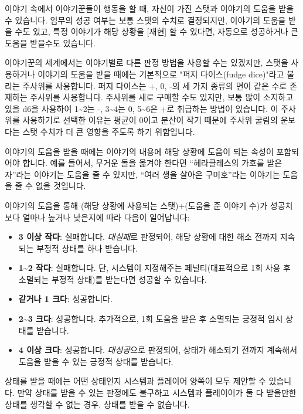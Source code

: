 \documentclass[12pt]{report}
\begin{document}
	이야기 속에서 이야기꾼들이 행동을 할 때, 자신이 가진 스탯과 이야기의 도움을 받을 수 있습니다. 임무의 성공 여부는 보통 스탯의 수치로 결정되지만, 이야기의 도움을 받을 수도 있고, 특정 이야기가 해당 상황을 [재현] 할 수 있다면, 자동으로 성공하거나 큰 도움을 받을수도 있습니다.
	
	\bigskip
	
	이야기꾼의 세계에서는 이야기별로 다른 판정 방법을 사용할 수는 있겠지만, 스탯을 사용하거나 이야기의 도움을 받을 때에는 기본적으로 "퍼지 다이스(fudge dice)"라고 불리는 주사위를 사용합니다. 퍼지 다이스는 +, 0, -의 세 가지 종류의 면이 같은 수로 존재하는 주사위를 사용합니다. 주사위를 새로 구매할 수도 있지만, 보통 많이 소지하고 있을 d6을 사용하여 1\textasciitilde2는 -, 3\textasciitilde4는 0, 5\textasciitilde6은 +로 취급하는 방법이 있습니다. 이 주사위를 사용하기로 선택한 이유는 평균이 0이고 분산이 작기 때문에 주사위 굴림의 운보다는 스탯 수치가 더 큰 영향을 주도록 하기 위함입니다.
	
	\bigskip
	
	이야기의 도움을 받을 때에는 이야기의 내용에 해당 상황에 도움이 되는 속성이 포함되어야 합니다. 예를 들어서, 무거운 돌을 옮겨야 한다면 “헤라클레스의 가호를 받은 자”라는 이야기는 도움을 줄 수 있지만, “여러 생을 살아온 구미호”라는 이야기는 도움을 줄 수 없을 것입니다.
	
	이야기의 도움을 통해 (해당 상황에 사용되는 스탯)+(도움을 준 이야기 수)가 성공치보다 얼마나 높거나 낮은지에 따라 다음이 일어납니다:
	\begin{itemize}
		\item \textbf{3 이상 작다}: 실패합니다. \emph{대실패}로 판정되어, 해당 상황에 대한 해소 전까지 지속되는 부정적 상태를 하나 받습니다.
		\item \textbf{1\textasciitilde2 작다}: 실패합니다. 단, 시스템이 지정해주는 페널티(대표적으로 1회 사용 후 소멸되는 부정적 상태)를 받는다면 성공할 수 있습니다.
		\item \textbf{같거나 1 크다}: 성공합니다.
		\item \textbf{2\textasciitilde3 크다}: 성공합니다. 추가적으로, 1회 도움을 받은 후 소멸되는 긍정적 임시 상태를 받습니다.
		\item \textbf{4 이상 크다}: 성공합니다. \emph{대성공}으로 판정되어, 상태가 해소되기 전까지 계속해서 도움을 받을 수 있는 긍정적 상태를 받습니다.
	\end{itemize}
	상태를 받을 때에는 어떤 상태인지 시스템과 플레이어 양쪽이 모두 제안할 수 있습니다. 만약 상태를 받을 수 있는 판정에도 불구하고 시스템과 플레이어가 둘 다 받을만한 상태를 생각할 수 없는 경우, 상태를 받을 수 없습니다.
	
\end{document}
